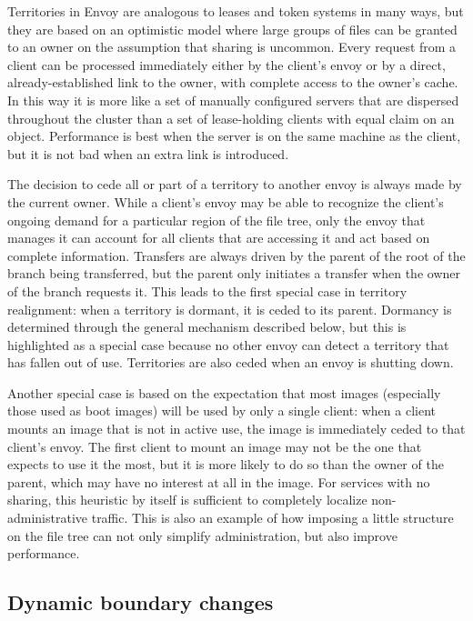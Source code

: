 Territories in Envoy are analogous to leases and token systems in many ways, but they are based on an optimistic model where large groups of files can be granted to an owner on the assumption that sharing is uncommon. Every request from a client can be processed immediately either by the client's envoy or by a direct, already-established link to the owner, with complete access to the owner's cache. In this way it is more like a set of manually configured servers that are dispersed throughout the cluster than a set of lease-holding clients with equal claim on an object. Performance is best when the server is on the same machine as the client, but it is not bad when an extra link is introduced.

The decision to cede all or part of a territory to another envoy is always made by the current owner. While a client's envoy may be able to recognize the client's ongoing demand for a particular region of the file tree, only the envoy that manages it can account for all clients that are accessing it and act based on complete information. Transfers are always driven by the parent of the root of the branch being transferred, but the parent only initiates a transfer when the owner of the branch requests it. This leads to the first special case in territory realignment: when a territory is dormant, it is ceded to its parent. Dormancy is determined through the general mechanism described below, but this is highlighted as a special case because no other envoy can detect a territory that has fallen out of use. Territories are also ceded when an envoy is shutting down.

Another special case is based on the expectation that most images (especially those used as boot images) will be used by only a single client: when a client mounts an image that is not in active use, the image is immediately ceded to that client's envoy. The first client to mount an image may not be the one that expects to use it the most, but it is more likely to do so than the owner of the parent, which may have no interest at all in the image. For services with no sharing, this heuristic by itself is sufficient to completely localize non-administrative traffic. This is also an example of how imposing a little structure on the file tree can not only simplify administration, but also improve performance.

\subsection{Dynamic boundary changes}

